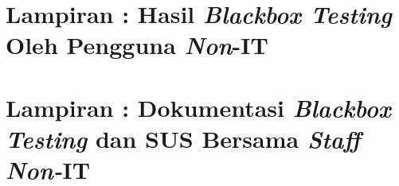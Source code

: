 \nextappendix
\section*{Lampiran \theappendixletter: Hasil \textit{Blackbox Testing} Oleh Pengguna \textit{Non}-IT
\label{sec:blackbox-testing-aplikasi-presensi-online-oleh-pengguna-non-it}}

\pagebreak

\nextappendix
\section*{Lampiran \theappendixletter: Dokumentasi \textit{Blackbox Testing} dan SUS Bersama \textit{Staff Non-}IT
\label{sec:dokumentasi-blackbox-testing-dan-sus-bersama-staff-non-it}}

\pagebreak




